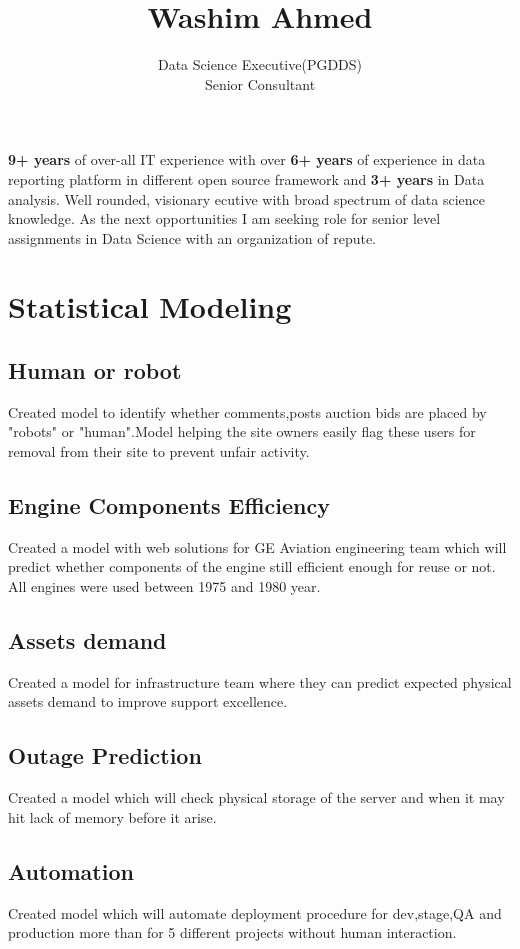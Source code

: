 \documentclass{article}
\title{\textbf{Washim Ahmed}}
\author{Data Science Executive(PGDDS)\\Senior Consultant}
\date{}
\begin{document}

\maketitle
\thispagestyle{empty}
\justify

\textbf{9+ years} of over-all IT experience with over \textbf{6+ years} of experience in data reporting platform in different open source framework and \textbf{3+ years} in Data analysis. Well rounded, visionary ecutive with broad spectrum of data science knowledge. As the next opportunities I am seeking role for senior level assignments in Data Science with an organization of repute.

\section{Statistical Modeling}
\subsection{Human or robot}
Created model to identify whether comments,posts auction bids are placed by "robots" or "human".Model helping the site owners easily flag these users for removal from their site to prevent unfair activity.

\subsection{Engine Components Efficiency}
Created a model with web solutions for GE Aviation engineering team which will predict whether components of the engine still efficient enough for reuse or not. All engines were used between 1975 and 1980 year.

\subsection{Assets demand}
Created a model for infrastructure team where they can predict expected physical assets demand to improve support excellence.

\subsection{Outage Prediction}
Created a model which will check physical storage of the server and when it may hit lack of memory before it arise.

\subsection{Automation}
Created model which will automate deployment procedure for dev,stage,QA and production more than for 5 different projects without human interaction. 
\end{document}
